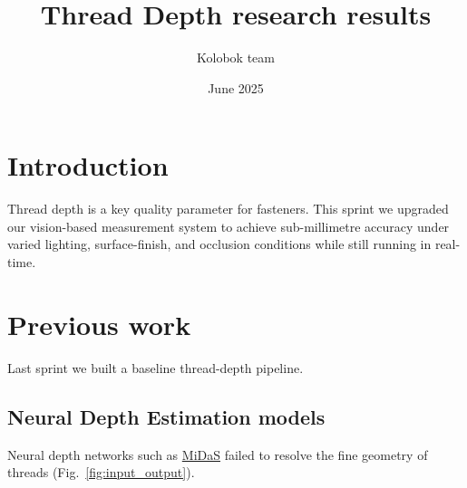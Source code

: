 \documentclass{article}
\author{Kolobok team}
\title{Thread Depth research results}
\date{June 2025}
\begin{document}
\maketitle

\section{Introduction}

Thread depth is a key quality parameter for fasteners. This sprint we upgraded our vision-based measurement system to achieve sub-millimetre accuracy under varied lighting, surface-finish, and occlusion conditions while still running in real-time.

\section{Previous work}

Last sprint we built a baseline thread-depth pipeline.

\subsection{Neural Depth Estimation models}

Neural depth networks such as \href{https://arxiv.org/pdf/1907.01341}{MiDaS} failed to resolve the fine geometry of threads (Fig.~\ref{fig:input_output}).
\end{document}
